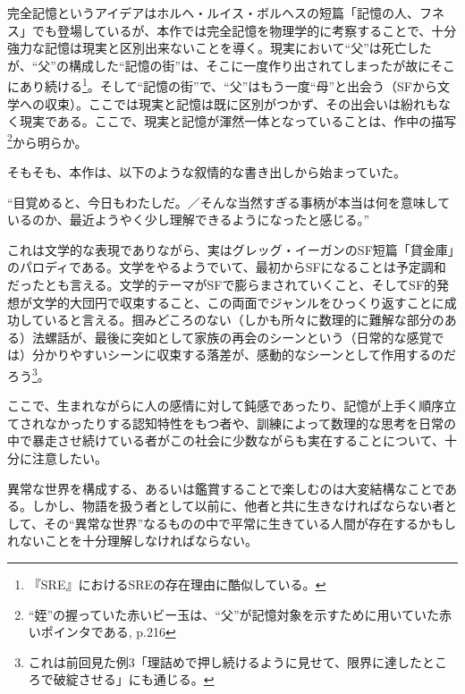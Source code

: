 \documentclass[10pt, a5paper, twoside]{jsarticle}
\theoremstyle{definition}
\begin{document}
		完全記憶というアイデアはホルヘ・ルイス・ボルヘスの短篇「記憶の人、フネス」でも登場しているが、本作では完全記憶を物理学的に考察することで、十分強力な記憶は現実と区別出来ないことを導く。現実において“父”は死亡したが、“父”の構成した“記憶の街”は、そこに一度作り出されてしまったが故にそこにあり続ける\footnote{『SRE』におけるSREの存在理由に酷似している。}。そして“記憶の街”で、“父”はもう一度“母”と出会う（SFから文学への収束）。ここでは現実と記憶は既に区別がつかず、その出会いは紛れもなく現実である。ここで、現実と記憶が渾然一体となっていることは、作中の描写\footnote{“姪”の握っていた赤いビー玉は、“父”が記憶対象を示すために用いていた赤いポインタである, \cite{hgn} p.216}から明らか。

		そもそも、本作は、以下のような叙情的な書き出しから始まっていた。

		“目覚めると、今日もわたしだ。／そんな当然すぎる事柄が本当は何を意味しているのか、最近ようやく少し理解できるようになったと感じる。”

		これは文学的な表現でありながら、実はグレッグ・イーガンのSF短篇「貸金庫」のパロディである。文学をやるようでいて、最初からSFになることは予定調和だったとも言える。文学的テーマがSFで膨らまされていくこと、そしてSF的発想が文学的大団円で収束すること、この両面でジャンルをひっくり返すことに成功していると言える。掴みどころのない（しかも所々に数理的に難解な部分のある）法螺話が、最後に突如として家族の再会のシーンという（日常的な感覚では）分かりやすいシーンに収束する落差が、感動的なシーンとして作用するのだろう\footnote{これは前回見た例3「理詰めで押し続けるように見せて、限界に達したところで破綻させる」にも通じる。}。

		ここで、生まれながらに人の感情に対して鈍感であったり、記憶が上手く順序立てされなかったりする認知特性をもつ者\cite{smz}や、訓練によって数理的な思考を日常の中で暴走させ続けている者\cite{kmr}がこの社会に少数ながらも実在することについて、十分に注意したい。

		異常な世界を構成する、あるいは鑑賞することで楽しむのは大変結構なことである。しかし、物語を扱う者として以前に、他者と共に生きなければならない者として、その“異常な世界”なるものの中で平常に生きている人間が存在するかもしれないことを十分理解しなければならない\cite{nkm}。
\end{document}
